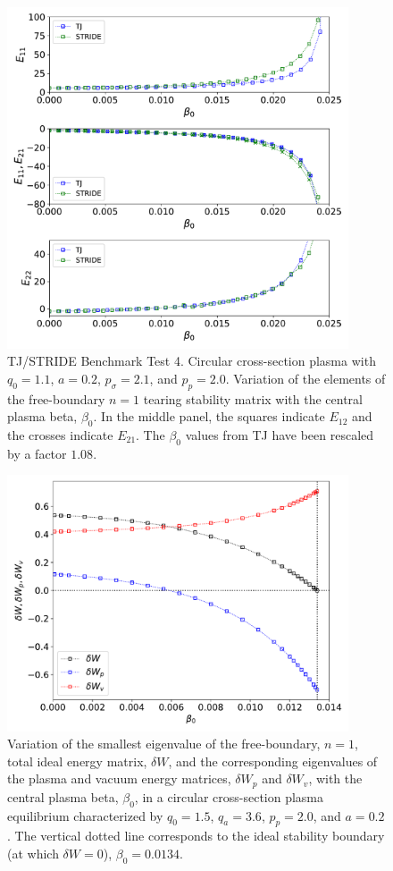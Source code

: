 \documentclass[12pt,prb,aps]{revtex4-1}
\begin{document}
\begin{figure}
\centerline{\includegraphics[width=0.9\textwidth]{Fig4.pdf}}
\caption{TJ/STRIDE Benchmark Test 4. Circular cross-section plasma with $q_0=1.1$, $a=0.2$, $p_\sigma=2.1$,  and $p_p=2.0$. Variation of the elements of the free-boundary $n=1$ tearing stability matrix with the central plasma beta,  $\beta_0$. In the middle panel, the squares
indicate  $E_{12}$ and the crosses indicate $E_{21}$. The $\beta_0$ values from TJ have  been rescaled by a factor $1.08$.\label{fig4}}
\end{figure}

\begin{figure}
\centerline{\includegraphics[width=0.9\textwidth]{Fig5.pdf}}
\caption{Variation of the smallest eigenvalue of the free-boundary, $n=1$, total ideal energy matrix, $\delta W$, and the corresponding eigenvalues of the plasma and vacuum energy matrices, 
$\delta W_p$ and $\delta W_v$, with the central plasma beta, $\beta_0$, in a circular cross-section plasma equilibrium characterized by $q_0=1.5$, $q_a= 3.6$, $p_p=2.0$, and
$a=0.2$. The vertical dotted line corresponds to the ideal stability boundary (at which $\delta W=0$), $\beta_0=0.0134$.  \label{fig5}}
\end{figure}
\end{document}
